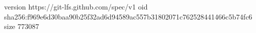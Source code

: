 version https://git-lfs.github.com/spec/v1
oid sha256:f969e6d30baa90b25f32ad6d94589ac557b31802071c762528441466c5b74fc6
size 773087
